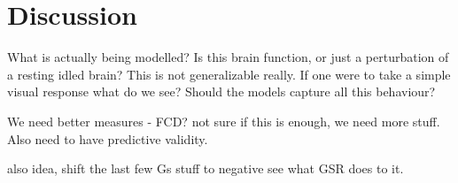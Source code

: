 \documentclass[oneside]{zHenriquesLab-StyleBioRxiv}
\begin{document}
\section*{Discussion}

What is actually being modelled? Is this brain function, or just a perturbation of a resting idled brain? This is not generalizable really. If one were to take a simple visual response what do we see? Should the models capture all this behaviour?

We need better measures - FCD? not sure if this is enough, we need more stuff. Also need to have predictive validity. 


also idea, shift the last few Gs stuff to negative see what GSR does to it.
\end{document}
